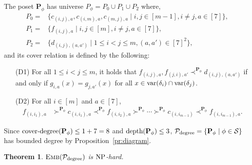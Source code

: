 \documentclass[usletter]{article}
\newcommand{\longversion}[1]{#1}
\newcommand{\shortversion}[1]{}
\newcommand{\longshort}[2]{\longversion{#1}\shortversion{#2}}
\newcommand{\pp}{\mathbf{P}}
\newtheorem{theorem}{Theorem}
\begin{document}
The poset $\pp_\phi$ has universe $P_\phi=P_{0} \cup P_{1} \cup P_{2}$ where, 
\begin{align*}
P_0 = & \{ c_{(i,j),a},c_{(i,m),a},c_{(m,j),a} \mid i,j \in [m-1], i\neq j, a \in [7] \}\text{,}\\
P_1 = & \{ f_{(i,j),a} \mid i,j\in [m], i\neq j, a \in [7] \}\text{,}\\
P_2 = & \{ d_{(i,j),(a,a')} \mid 1 \leq i<j \leq m, (a,a') \in [7]^2 \}\text{,}
\end{align*}
and its cover relation is defined by the following:
\begin{itemize}
\item[(D1)] For all $1 \leq i<j \leq m$, it holds that 
$f_{(i,j),a},f_{(j,i),a'} \prec^{\pp_\phi} d_{(i,j),(a,a')}$ if and only if $g_{i,a}(x)=g_{j,a'}(x)$ 
for all $x \in \textup{var}(\delta_i) \cap \textup{var}(\delta_j)$.  

\item[(D2)] For all $i \in [m]$ and $a \in [7]$, 
\longshort{\begin{align*}
f_{(i,i_{1}),a} & \succ^{\pp_\phi} c_{(i,i_1),a} \prec^{\pp_\phi} f_{(i,i_2),a} \succ^{\pp_\phi} \cdots \succ^{\pp_\phi} c_{(i,i_{m-1})} \prec^{\pp_\phi} f_{(i,i_{m-1}),a}\text{.}
\end{align*}}{\begin{align*}
f_{(i,i_{1}),a} & \succ^{\pp_\phi} c_{(i,i_1),a} \prec^{\pp_\phi} f_{(i,i_2),a} \succ^{\pp_\phi} \cdots\\ 
\cdots & \succ^{\pp_\phi} c_{(i,i_{m-1})} \prec^{\pp_\phi} f_{(i,i_{m-1}),a}\text{.}
\end{align*}}
\end{itemize}
Since $\textup{cover\textup{-}degree}(\pp_{\phi}) \leq 1+7=8$ and 
$\textup{depth}(\pp_{\phi}) \leq 3$, $\mathcal{P}_{\textup{degree}}=\{ \pp_{\phi} \mid \phi \in \mathcal{S} \}$ 
has bounded degree by Proposition~\ref{pr:diagram}.

\longshort{\begin{theorem}}{\begin{theorem}[$\star$]}
\label{th:degreenphard} 
$\textsc{Emb}(\mathcal{P}_{\textup{degree}})$ is $\textup{NP}$-hard. 
\end{theorem}
\end{document}
